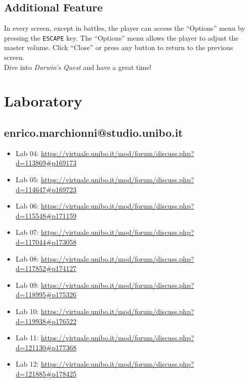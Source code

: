 \documentclass[12pt, a4paper]{report}
\theoremstyle{definition}
\begin{document}
\section{Additional Feature}
In every screen, except in battles, the player can access the ``Options'' menu by pressing the \verb|ESCAPE| key.
The ``Options'' menu allows the player to adjust the master volume. Click ``Close'' or press any button to return to the previous screen.\\
Dive into \emph{Darwin's Quest} and have a great time!


\chapter{Laboratory}

\section{enrico.marchionni@studio.unibo.it}

\begin{itemize}
    \item Lab 04: \url{https://virtuale.unibo.it/mod/forum/discuss.php?d=113869#p169173}
    \item Lab 05: \url{https://virtuale.unibo.it/mod/forum/discuss.php?d=114647#p169723}
    \item Lab 06: \url{https://virtuale.unibo.it/mod/forum/discuss.php?d=115548#p171159}
    \item Lab 07: \url{https://virtuale.unibo.it/mod/forum/discuss.php?d=117044#p173058}
    \item Lab 08: \url{https://virtuale.unibo.it/mod/forum/discuss.php?d=117852#p174127}
    \item Lab 09: \url{https://virtuale.unibo.it/mod/forum/discuss.php?d=118995#p175326}
    \item Lab 10: \url{https://virtuale.unibo.it/mod/forum/discuss.php?d=119938#p176522}
    \item Lab 11: \url{https://virtuale.unibo.it/mod/forum/discuss.php?d=121130#p177368}
    \item Lab 12: \url{https://virtuale.unibo.it/mod/forum/discuss.php?d=121885#p178425}
\end{itemize}

\printbibliography
\end{document}
